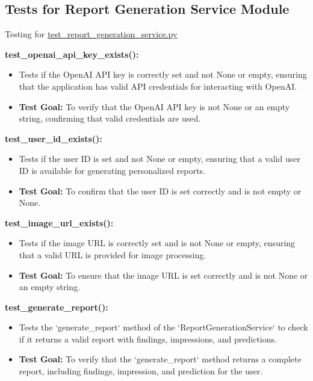 \documentclass[12pt, titlepage]{article}
\begin{document}
\begin{enumerate}
\begin{enumerate}
\begin{enumerate}
\begin{enumerate}
\subsection{Tests for {Report Generation Service Module}}
Testing for \href{https://github.com/RezaJodeiri/CXR-Capstone/blob/main/src/backend/test/test_report_generation_service.py}{test\_report\_generation\_service.py}

\textbf{test\_openai\_api\_key\_exists():}  
\begin{itemize}
    \item Tests if the OpenAI API key is correctly set and not None or empty, ensuring that the application has valid API credentials for interacting with OpenAI.
    \item \textbf{Test Goal:} To verify that the OpenAI API key is not None or an empty string, confirming that valid credentials are used.
    \newline
\end{itemize}

\textbf{test\_user\_id\_exists():}  
\begin{itemize}
    \item Tests if the user ID is set and not None or empty, ensuring that a valid user ID is available for generating personalized reports.
    \item \textbf{Test Goal:} To confirm that the user ID is set correctly and is not empty or None.
    \newline
\end{itemize}

\textbf{test\_image\_url\_exists():}  
\begin{itemize}
    \item Tests if the image URL is correctly set and is not None or empty, ensuring that a valid URL is provided for image processing.
    \item \textbf{Test Goal:} To ensure that the image URL is set correctly and is not None or an empty string.
    \newline
\end{itemize}

\textbf{test\_generate\_report():}  
\begin{itemize}
    \item Tests the `generate\_report` method of the `ReportGenerationService` to check if it returns a valid report with findings, impressions, and predictions.
    \item \textbf{Test Goal:} To verify that the `generate\_report` method returns a complete report, including findings, impression, and prediction for the user.
    \newline
\end{itemize}


\end{enumerate}
\end{enumerate}
\end{enumerate}
\end{enumerate}
\end{document}
